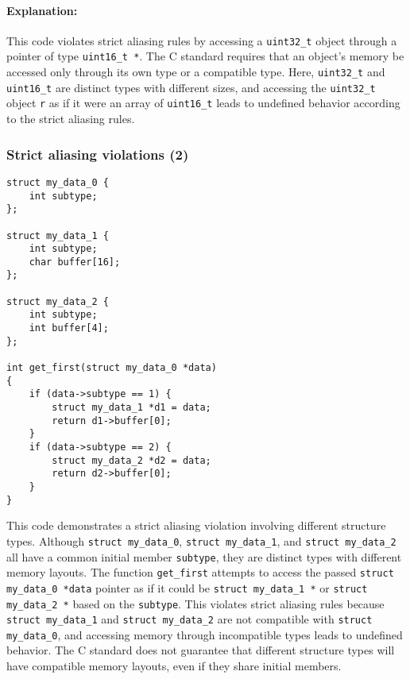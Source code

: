 \documentclass[12pt]{article}
\begin{document}
\paragraph{Explanation:}
This code violates strict aliasing rules by accessing a \texttt{uint32\_t} object through a pointer of type \texttt{uint16\_t *}. The C standard requires that an object's memory be accessed only through its own type or a compatible type. Here, \texttt{uint32\_t} and \texttt{uint16\_t} are distinct types with different sizes, and accessing the \texttt{uint32\_t} object \texttt{r} as if it were an array of \texttt{uint16\_t} leads to undefined behavior according to the strict aliasing rules.



\subsubsection{Strict aliasing violations (2)}
\begin{lstlisting}
struct my_data_0 {
    int subtype;
};

struct my_data_1 {
    int subtype;
    char buffer[16];
};

struct my_data_2 {
    int subtype;
    int buffer[4];
};

int get_first(struct my_data_0 *data)
{
    if (data->subtype == 1) {
        struct my_data_1 *d1 = data;
        return d1->buffer[0];
    }
    if (data->subtype == 2) {
        struct my_data_2 *d2 = data;
        return d2->buffer[0];
    }
}
\end{lstlisting}


This code demonstrates a strict aliasing violation involving different structure types. Although \texttt{struct my\_data\_0}, \texttt{struct my\_data\_1}, and \texttt{struct my\_data\_2} all have a common initial member \texttt{subtype}, they are distinct types with different memory layouts. The function \texttt{get\_first} attempts to access the passed \texttt{struct my\_data\_0 *data} pointer as if it could be \texttt{struct my\_data\_1 *} or \texttt{struct my\_data\_2 *} based on the \texttt{subtype}. This violates strict aliasing rules because \texttt{struct my\_data\_1} and \texttt{struct my\_data\_2} are not compatible with \texttt{struct my\_data\_0}, and accessing memory through incompatible types leads to undefined behavior. The C standard does not guarantee that different structure types will have compatible memory layouts, even if they share initial members.
\end{document}
